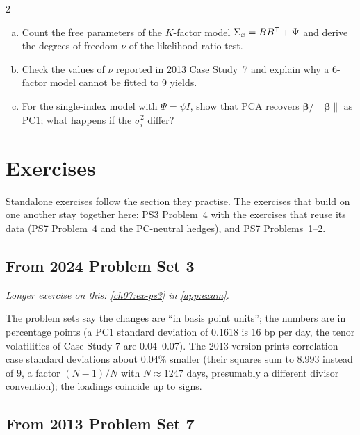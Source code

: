 \begin{paracol}{2}
\begin{exercise}\label{ch07:ex-fa}
\leavevmode
\begin{enumerate}[(a)]
  \item Count the free parameters of the $K$-factor model $\Sigma_x=BB^{\mathsf T}+\Psi$ and derive the degrees of freedom $\nu$ of the
      likelihood-ratio test.
  \item Check the values of $\nu$ reported in 2013 Case Study~7 and explain why a 6-factor model
      cannot be fitted to 9 yields.
  \item For the single-index model with $\Psi=\psi I$, show that PCA recovers $\bm\beta/\|\bm\beta\|$ as
      PC1; what happens if the $\sigma_i^2$ differ?
\end{enumerate}
\end{exercise}

\section*{Exercises}
Standalone exercises follow the section they practise. The exercises that build on one another stay together here: PS3 Problem~4 with the exercises that reuse its data (PS7 Problem~4 and the PC-neutral hedges), and PS7 Problems~1--2.

\subsection*{From 2024 Problem Set 3}

\noindent\emph{Longer exercise on this: \cref{ch07:ex-ps3} in \cref{app:exam}.}

\begin{coursenote}
The problem sets say the changes are ``in basis point units''; the numbers are in percentage points (a PC1
standard deviation of 0.1618 is 16 bp per day, the tenor volatilities of Case Study 7 are 0.04--0.07). The 2013
version prints correlation-case standard deviations about $0.04\%$ smaller (their squares sum to $8.993$ instead of
$9$, a factor $(N-1)/N$ with $N\approx1247$ days, presumably a different divisor convention); the loadings coincide up
to signs.
\end{coursenote}

\subsection*{From 2013 Problem Set 7}


\end{paracol}

